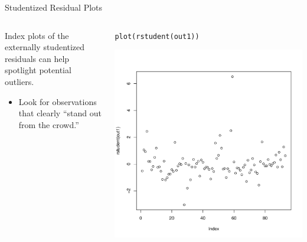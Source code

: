 \documentclass[10pt]{beamer}\usepackage[]{graphicx}\usepackage[]{color}
\makeatletter
\def\maxwidth{ %
  \ifdim\Gin@nat@width>\linewidth
    \linewidth
  \else
    \Gin@nat@width
  \fi
}
\newcommand{\hlstd}[1]{\textcolor[rgb]{0,0,0}{#1}}%
\newcommand{\hlkwd}[1]{\textcolor[rgb]{0.004,0.004,0.506}{#1}}%
\newenvironment{kframe}{%
 \def\at@end@of@kframe{}%
 \ifinner\ifhmode%
  \def\at@end@of@kframe{\end{minipage}}%
  \begin{minipage}{\columnwidth}%
 \fi\fi%
 \def\FrameCommand##1{\hskip\@totalleftmargin \hskip-\fboxsep
 \colorbox{shadecolor}{##1}\hskip-\fboxsep
     \hskip-\linewidth \hskip-\@totalleftmargin \hskip\columnwidth}%
 \MakeFramed {\advance\hsize-\width
   \@totalleftmargin\z@ \linewidth\hsize
   \@setminipage}}%
 {\par\unskip\endMakeFramed%
 \at@end@of@kframe}
\newenvironment{knitrout}{}{} %
\makeatother
\begin{document}
\watermarkoff %

\begin{frame}{Studentized Residual Plots}

  \begin{columns}
    \begin{column}{0.5\textwidth}

      Index plots of the externally studentized residuals can help spotlight
      potential outliers.
      \vb
      \begin{itemize}
      \item Look for observations that clearly ``stand out from the crowd.''
      \end{itemize}

    \end{column}

    \begin{column}{0.5\textwidth}

\begin{knitrout}\footnotesize
{}\color{fgcolor}\begin{kframe}
\begin{alltt}
\hlkwd{plot}\hlstd{(}\hlkwd{rstudent}\hlstd{(out1))}
\end{alltt}
\end{kframe}

{\centering \includegraphics[width=\maxwidth]{figure/assumptions-unnamed-chunk-21-1} 

}


\end{knitrout}



\end{column}
\end{columns}

\end{frame}
\end{document}
